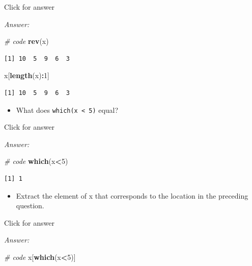 \documentclass[
]{book}
\newenvironment{Shaded}{\begin{snugshade}}{\end{snugshade}}
\newcommand{\CommentTok}[1]{\textcolor[rgb]{0.56,0.35,0.01}{\textit{#1}}}
\newcommand{\DecValTok}[1]{\textcolor[rgb]{0.00,0.00,0.81}{#1}}
\newcommand{\FunctionTok}[1]{\textcolor[rgb]{0.13,0.29,0.53}{\textbf{#1}}}
\newcommand{\NormalTok}[1]{#1}
\newcommand{\SpecialCharTok}[1]{\textcolor[rgb]{0.81,0.36,0.00}{\textbf{#1}}}
\providecommand{\tightlist}{%
  \setlength{\itemsep}{0pt}\setlength{\parskip}{0pt}}
\begin{document}
Click for answer

\emph{Answer:}

\begin{Shaded}
\begin{Highlighting}[]
\CommentTok{\# code}
\FunctionTok{rev}\NormalTok{(x)}
\end{Highlighting}
\end{Shaded}

\begin{verbatim}
[1] 10  5  9  6  3
\end{verbatim}

\begin{Shaded}
\begin{Highlighting}[]
\NormalTok{x[}\FunctionTok{length}\NormalTok{(x)}\SpecialCharTok{:}\DecValTok{1}\NormalTok{]}
\end{Highlighting}
\end{Shaded}

\begin{verbatim}
[1] 10  5  9  6  3
\end{verbatim}

\begin{itemize}
\tightlist
\item
  What does \texttt{which(x\ \textless{}\ 5)} equal?
\end{itemize}

Click for answer

\emph{Answer:}

\begin{Shaded}
\begin{Highlighting}[]
\CommentTok{\# code}
\FunctionTok{which}\NormalTok{(x}\SpecialCharTok{\textless{}}\DecValTok{5}\NormalTok{)}
\end{Highlighting}
\end{Shaded}

\begin{verbatim}
[1] 1
\end{verbatim}

\begin{itemize}
\tightlist
\item
  Extract the element of x that corresponds to the location in the preceding question.
\end{itemize}

Click for answer

\emph{Answer:}

\begin{Shaded}
\begin{Highlighting}[]
\CommentTok{\# code}
\NormalTok{x[}\FunctionTok{which}\NormalTok{(x}\SpecialCharTok{\textless{}}\DecValTok{5}\NormalTok{)]}
\end{Highlighting}
\end{Shaded}
\end{document}
